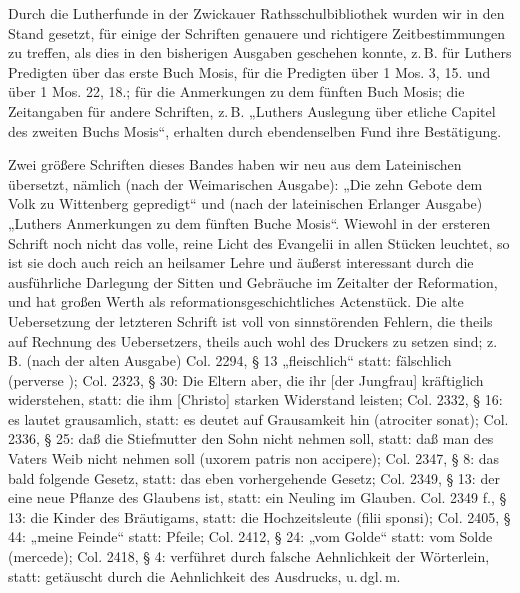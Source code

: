 Durch die Lutherfunde in der Zwickauer Rathsschulbibliothek wurden wir in den Stand gesetzt, für einige der Schriften genauere und richtigere Zeitbestimmungen zu treffen, als dies in den bisherigen Ausgaben geschehen konnte, z.\,B. für Luthers Predigten über das erste Buch Mosis, für die Predigten über 1 Mos. 3, 15. und über 1 Mos. 22, 18.; für die Anmerkungen zu dem fünften Buch Mosis; die Zeitangaben für andere Schriften, z.\,B. „Luthers Auslegung über etliche Capitel des zweiten Buchs Mosis“, erhalten durch ebendenselben Fund ihre Bestätigung.

Zwei größere Schriften dieses Bandes haben wir neu aus dem Lateinischen übersetzt, nämlich (nach der Weimarischen Ausgabe): „Die zehn Gebote dem Volk zu Wittenberg gepredigt“ und (nach der lateinischen Erlanger Ausgabe) „Luthers Anmerkungen zu dem fünften Buche Mosis“. Wiewohl in der ersteren Schrift noch nicht das volle, reine Licht des Evangelii in allen Stücken leuchtet, so ist sie doch auch reich an heilsamer Lehre und äußerst interessant durch die ausführliche Darlegung der Sitten und Gebräuche im Zeitalter der Reformation, und hat großen Werth als reformationsgeschichtliches Actenstück. Die alte Uebersetzung der letzteren Schrift ist voll von sinnstörenden Fehlern, die theils auf Rechnung des Uebersetzers, theils auch wohl des Druckers zu setzen sind; z.\,B. (nach der alten Ausgabe) Col. 2294, § 13 „fleischlich“ statt: fälschlich (perverse
); Col. 2323, § 30: Die Eltern aber, die ihr [der Jungfrau] kräftiglich widerstehen, statt: die ihm [Christo] starken Widerstand leisten; Col. 2332, § 16: es lautet grausamlich, statt: es deutet auf Grausamkeit hin (atrociter sonat); Col. 2336, § 25: daß die Stiefmutter den Sohn nicht nehmen soll, statt: daß man des Vaters Weib nicht nehmen soll (uxorem patris non accipere); Col. 2347, § 8: das bald folgende Gesetz, statt: das eben vorhergehende Gesetz; Col. 2349, § 13: der eine neue Pflanze des Glaubens ist, statt: ein Neuling im Glauben. Col. 2349 f., § 13: die Kinder des Bräutigams, statt: die Hochzeitsleute (filii sponsi); Col. 2405, § 44: „meine Feinde“ statt: Pfeile; Col. 2412, § 24: „vom Golde“ statt: vom Solde (mercede); Col. 2418, § 4: verführet durch falsche Aehnlichkeit der Wörterlein, statt: getäuscht durch die Aehnlichkeit des Ausdrucks, u.\,dgl.\,m.

